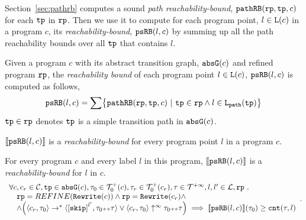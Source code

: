 Section~\ref{sec:pathrb} computes a sound \emph{path reachability-bound}, $\mathtt{pathRB}(\mathtt{rp}, \mathtt{tp}, c)$ for each $\mathtt{tp}$ in $\mathtt{rp}$.
Then we use it to compute for each program point, $l \in \mathtt{L}(c)$ in a program $c$,
its \emph{reachability-bound}, $\mathtt{psRB}(l, c)$ by summing up all the path reachability bounds over all $\mathtt{tp}$ that contains $l$.
%
\begin{defn}
\label{def:point_psrb}
Given a program $c$ with its {abstract transition graph}, $\mathtt{abs}{\mathtt{G}}(c)$ and refined program $\mathtt{rp}$,
the \emph{reachability bound} of each program point $l \in \mathtt{L}(c)$, $\mathtt{psRB}(l, c)$ is computed as follows,
\[ 
 \psRB(l, c) = 
 \sum
 \left\{ \inoutB(\rprog, \tpath, c) ~\vert~ \tpath \in \rprog \land 
 l \in \pathl(\tpath) \right\}
\]
$\mathtt{tp} \in \mathtt{rp}$ denotes $\mathtt{tp}$ is a simple transition path in $\mathtt{abs}{\mathtt{G}}(c)$.
\end{defn}
$\llbracket \mathtt{psRB}(l, c) \rrbracket$ is a \emph{reachability-bound} for every program point $l$ in a program $c$.
\begin{thm}[Soundness]
\label{thm:pathsensitive_rb_soundness}
For every program ${c}$ and every label $l$ in this program,
$\llbracket \mathtt{psRB}(l, c) \rrbracket$ is a \emph{reachability-bound} for $l$ in $c$.
%
{\small
\[
 \begin{array}{l}
 \forall c, c_r \in \cdom, \tpath \in \absG(c), \trace_0 \in \ftdom_0(c), \trace_r \in \ftdom_0(c_r), \trace \in \tdom, l, l' \in \ldom, \rprog \st 
 \\ \quad
 \rprog = REFINE(\algrewrite(c))
 \land 
 \rprog = \algrewrite(c_r)
 \land
 \\ \quad
 \land
 \Big(
 \config{c_r, \trace_0} \rightarrow^* \config{\clabel{\eskip}^{l'}, \trace_0 \tracecat \trace}
 \lor \config{c_r, \trace_0} \uparrow^{\infty} \trace_0 \tracecat \trace 
 \Big)
 \implies \econfig{\psRB(l, c)}(\trace_0) \geq \counter(\trace, l)
 \end{array}.
\]
}
\end{thm}